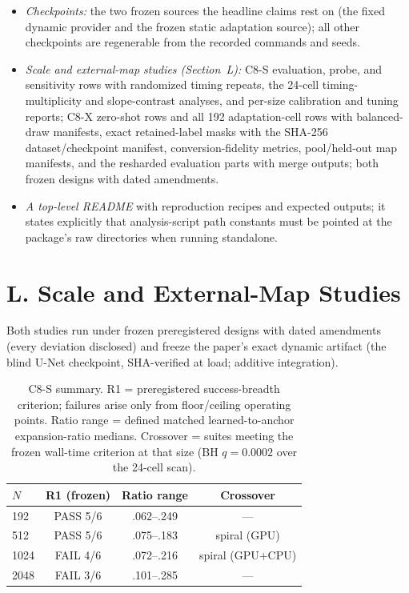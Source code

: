 \documentclass[letterpaper]{article} %
\newcommand{\stage}[1]{\textsc{#1}}
\begin{document}
\begin{itemize}
    \item \emph{Checkpoints:} the two frozen sources the headline claims rest on (the fixed dynamic provider and the frozen static adaptation source); all other checkpoints are regenerable from the recorded commands and seeds.
    \item \emph{Scale and external-map studies (Section~L):} \stage{C8-S} evaluation, probe, and sensitivity rows with randomized timing repeats, the 24-cell timing-multiplicity and slope-contrast analyses, and per-size calibration and tuning reports; \stage{C8-X} zero-shot rows and all 192 adaptation-cell rows with balanced-draw manifests, exact retained-label masks with the SHA-256 dataset/checkpoint manifest, conversion-fidelity metrics, pool/held-out map manifests, and the resharded evaluation parts with merge outputs; both frozen designs with dated amendments.
    \item \emph{A top-level README} with reproduction recipes and expected outputs; it states explicitly that analysis-script path constants must be pointed at the package's raw directories when running standalone.
\end{itemize}

\section{L. Scale and External-Map Studies}

Both studies run under frozen preregistered designs with dated amendments (every deviation disclosed) and freeze the paper's exact dynamic artifact (the blind U-Net checkpoint, SHA-verified at load; additive integration).

\begin{table}[t]
\centering
\small
\setlength{\tabcolsep}{2.6pt}
\begin{tabular}{@{}lccc@{}}
\toprule
$N$ & R1 (frozen) & Ratio range & Crossover \\
\midrule
192 & PASS 5/6 & .062--.249 & --- \\
512 & PASS 5/6 & .075--.183 & spiral (GPU) \\
1024 & FAIL 4/6 & .072--.216 & spiral (GPU+CPU) \\
2048 & FAIL 3/6 & .101--.285 & --- \\
\bottomrule
\end{tabular}
\caption{\stage{C8-S} summary. R1 = preregistered success-breadth criterion; failures arise only from floor/ceiling operating points. Ratio range = defined matched learned-to-anchor expansion-ratio medians. Crossover = suites meeting the frozen wall-time criterion at that size (BH $q{=}0.0002$ over the 24-cell scan).}
\label{tab:c8s-summary}
\end{table}
\end{document}

